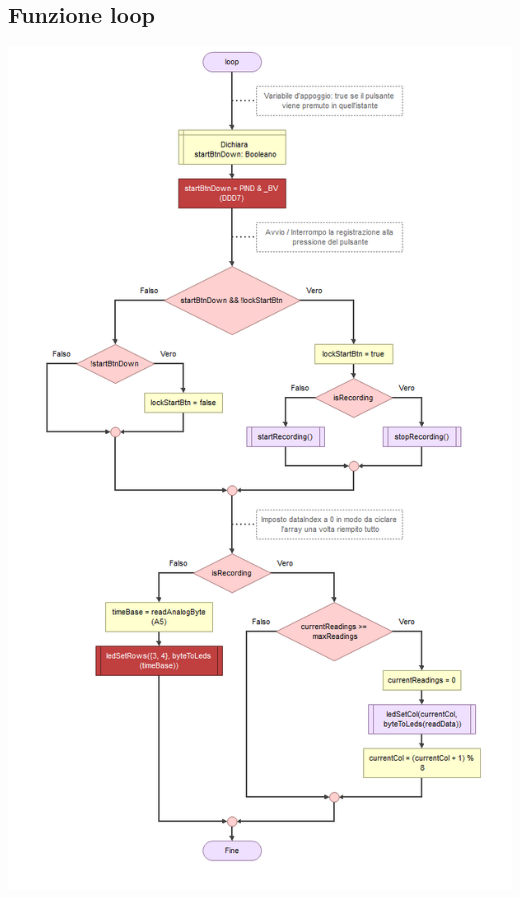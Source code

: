\documentclass{article}
\begin{document}
\subsection{Funzione loop}
\includegraphics[scale=.50]{funLoop.png}
\end{document}
